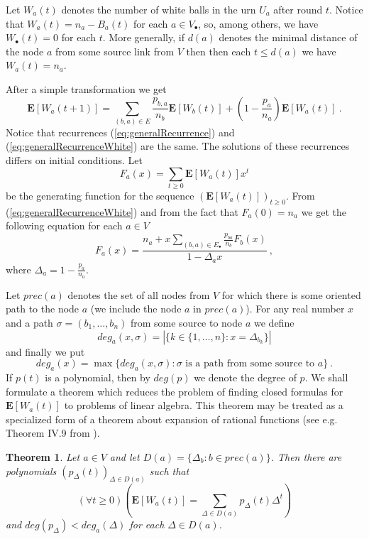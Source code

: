 \documentclass[submission]{dmtcs}
\newtheorem{theorem}{Theorem}
\newcommand{\E}[1]{\mathbf{E}\left[#1\right]}
\begin{document}
Let $W_a(t)$ denotes the number of white balls in the urn $U_a$ 
after round $t$. Notice that $W_a(t) = n_a - B_a(t)$ for each $a\in V_{\bullet}$, 
so,  among others, we have  $W_{\bullet}(t) = 0$ for each $t$. More generally,
if $d(a)$ denotes the minimal distance of the node $a$ from some 
source link from $V$ then then each $t\leq d(a)$ we have $W_a(t) = n_a$.

After a simple transformation we get
\begin{equation}
\label{eq:generalRecurrenceWhite}
\E{W_a(t+1)} = 
\sum_{(b,a)\in E} \frac{p_{b,a}}{n_b} \E{W_b(t)} +
\left(1-\frac{p_a}{n_a}\right) \E{W_a(t)}~.
\end{equation}
Notice that recurrences (\ref{eq:generalRecurrence}) and 
(\ref{eq:generalRecurrenceWhite}) are the same. 
The solutions of these recurrences
differs on initial conditions.
Let
$$
  F_a(x) = \sum_{t\geq 0} \E{W_a(t)} x^t
$$
be the generating function for the sequence $(\E{W_a(t)})_{t\geq 0}$.
From (\ref{eq:generalRecurrenceWhite}) and from the fact that $F_a(0)=n_a$ we get the following equation 
for each $a\in V$
$$
  F_a(x) = \frac{n_a + x \sum_{(b,a)\in E_{\bullet}} \frac{p_{ba}}{n_b} F_b(x)}{1 - \Delta_a x} ~,
$$
where $\Delta_a = 1 - \frac{p_a}{n_a}$.

Let $prec(a)$ denotes the set of all nodes from $V$ for which there is some oriented path
to the node $a$ (we include the node $a$ in $prec(a)$). For any real number
$x$ and a path $\sigma=(b_1,\ldots,b_n)$ from some source to node $a$ 
we define 
$$
 deg_a(x,\sigma) = |\{k \in \{1,\ldots,n\}:x=\Delta_{b_k}\}| 
$$
and finally we put 
$$
  deg_a(x) = \max\{deg_a(x,\sigma): \sigma \mbox{ is a path from some source to } a\}~.
$$
If $p(t)$ is a polynomial, then by $deg(p)$ we denote the degree of $p$.
We shall formulate a theorem which reduces the problem of finding closed formulas
for $\E{W_a(t)}$ to problems of linear algebra.
This theorem may be treated as a specialized 
form of a theorem about expansion of rational functions 
(see e.g. Theorem IV.9 from \cite{FLA}).

\begin{theorem}
\label{thm:toLineraAlgebra}
Let $a\in V$ and let $D(a) = \{\Delta_b: b \in prec(a)\}$. 
Then there are polynomials
$(p_{\Delta}(t))_{\Delta \in D(a)}$ such that 
$$
	(\forall t\geq 0)\left(
	\E{W_a(t)} = \sum_{\Delta \in D(a)} p_{\Delta}(t) \Delta^t
	\right)
$$
and $deg(p_{\Delta}) < deg_a(\Delta)$ 
for each $\Delta\in D(a)$.
\end{theorem}
\end{document}
